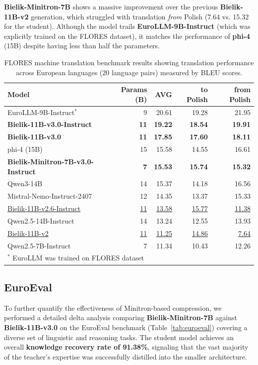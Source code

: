 \documentclass{article}
\begin{document}
\textbf{Bielik-Minitron-7B} shows a massive improvement over the previous \textbf{Bielik-11B-v2} generation, which struggled with translation \textit{from} Polish (7.64 vs. 15.32 for the student). Although the model trails \textbf{EuroLLM-9B-Instruct} (which was explicitly trained on the FLORES dataset), it matches the performance of \textbf{phi-4} (15B) despite having less than half the parameters.

\begin{table}[t]
  \centering
  \small
  \begin{tabular}{lrrrr}
  \toprule
  \textbf{Model} & \textbf{Params (B)} & \textbf{AVG} & \textbf{to Polish} & \textbf{from Polish} \\
  \midrule
  EuroLLM-9B-Instruct$^{*}$ & 9 & 20.61 & 19.28 & 21.95 \\
  \textbf{Bielik-11B-v3.0-Instruct} & \textbf{11} & \textbf{19.22} & \textbf{18.54} & \textbf{19.91} \\
  \textbf{Bielik-11B-v3.0} & \textbf{11} & \textbf{17.85} & \textbf{17.60} & \textbf{18.11} \\
  phi-4 (15B) & 15 & 15.58 & 14.55 & 16.61 \\
  \textbf{Bielik-Minitron-7B-v3.0-Instruct} & \textbf{7} & \textbf{15.53} & \textbf{15.74} & \textbf{15.32} \\
  Qwen3-14B & 14 & 15.37 & 14.18 & 16.56 \\
  Mistral-Nemo-Instruct-2407 & 12 & 14.35 & 13.37 & 15.33 \\
  \underline{Bielik-11B-v2.6-Instruct} & \underline{11} & \underline{13.58} & \underline{15.77} & \underline{11.38} \\
  Qwen2.5-14B-Instruct & 14 & 13.24 & 12.55 & 13.93 \\
  \underline{Bielik-11B-v2} & \underline{11} & \underline{11.25} & \underline{14.86} & \underline{7.64} \\
  Qwen2.5-7B-Instruct & 7 & 11.34 & 10.43 & 12.26 \\
  \bottomrule
  \multicolumn{5}{l}{$^{*}$ EuroLLM was trained on FLORES dataset} \\
  \end{tabular}
  \caption{FLORES machine translation benchmark results showing translation performance across European languages (20 language pairs) measured by BLEU scores.}
  \label{tab:flores}
\end{table}


\subsection{EuroEval}
To further quantify the effectiveness of Minitron-based compression, we performed a detailed delta analysis comparing \textbf{Bielik-Minitron-7B} against \textbf{Bielik-11B-v3.0} on the EuroEval benchmark (Table~\ref{tab:euroeval}) covering a diverse set of linguistic and reasoning tasks. The student model achieves an overall \textbf{knowledge recovery rate of 91.38\%}, signaling that the vast majority of the teacher's expertise was successfully distilled into the smaller architecture.
\end{document}
